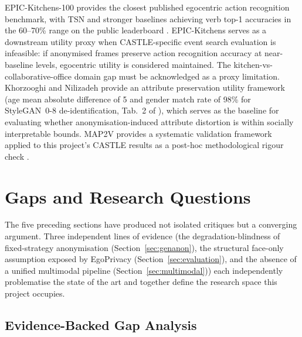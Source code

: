 \documentclass[12pt, onecolumn]{IEEEtran}
\begin{document}
EPIC-Kitchens-100 \cite{damen2022epic} provides the closest published
egocentric action recognition benchmark, with TSN and stronger baselines
achieving verb top-1 accuracies in the 60--70\% range on the public
leaderboard \cite{damen2022epic}. EPIC-Kitchens serves as a downstream utility proxy
when CASTLE-specific event search evaluation is infeasible: if
anonymised frames preserve action recognition accuracy at near-baseline
levels, egocentric utility is considered maintained. The
kitchen-vs-collaborative-office domain gap must be acknowledged as a
proxy limitation. Khorzooghi and Nilizadeh \cite{khorzooghi2023gan}
provide an attribute preservation utility framework (age mean absolute
difference of 5 and gender match rate of 98\% for StyleGAN~0-8
de-identification, Tab.~2 of \cite{khorzooghi2023gan}), which serves as the baseline for evaluating
whether anonymisation-induced attribute distortion is within socially
interpretable bounds. MAP2V \cite{zhang2024map2v} provides a systematic
validation framework applied to this project's CASTLE results as a
post-hoc methodological rigour check \cite{zhang2024map2v}.







\section{Gaps and Research Questions}
\label{sec:gaps}

The five preceding sections have produced not isolated critiques but a
converging argument. Three independent lines of evidence (the
degradation-blindness of fixed-strategy anonymisation
(Section~\ref{sec:genanon}), the structural face-only assumption exposed
by EgoPrivacy (Section~\ref{sec:evaluation}), and the absence of a
unified multimodal pipeline (Section~\ref{sec:multimodal})) each
independently problematise the state of the art and together define the
research space this project occupies.

\subsection{Evidence-Backed Gap Analysis}
\end{document}
